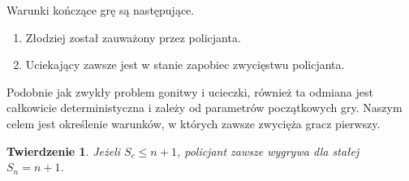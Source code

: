 \documentclass[brudnopis]{xmgr}
\newtheorem{Twierdzenie}{Twierdzenie}
\theoremstyle{definition}
\begin{document}
\noindent Warunki kończące grę są następujące.
\begin{enumerate}
  \item Złodziej został zauważony przez policjanta.
  \item Uciekający zawsze jest w stanie zapobiec zwycięstwu policjanta.
\end{enumerate}

Podobnie jak zwykły problem gonitwy i ucieczki, również ta odmiana jest całkowicie deterministyczna i zależy od parametrów początkowych gry. Naszym celem jest określenie warunków, w których zawsze zwycięża gracz pierwszy. 

\begin{Twierdzenie} \cite{poscig}
	Jeżeli $S_c \le n + 1$, policjant zawsze wygrywa dla stałej $S_n = n + 1$. 
\end{Twierdzenie}
\end{document}

